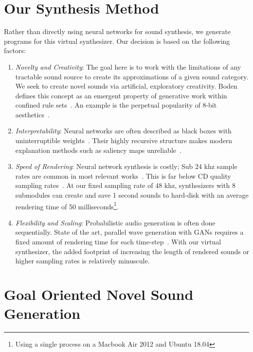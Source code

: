 \documentclass[\main/thesis.tex]{subfiles}
\begin{document}
\section{Our Synthesis Method}
 Rather than directly using neural networks for sound synthesis, we generate programs for this virtual synthesizer. Our decision is based on the following factors:
\begin{enumerate}[label=(\roman*)]
    \item \textit{Novelty and Creativity}: The goal here is to work with the limitations of any tractable sound source to create its approximations of a given sound category. We seek to create novel sounds via artificial, exploratory creativity. Boden defines this concept as an emergent property of generative work within confined rule sets~\cite{boden2009computer}. An example is the perpetual popularity of 8-bit aesthetics~\cite{collins2007loop}. 
    \item \textit{Interpretability}: Neural networks are often described as black boxes with uninterruptible weights~\cite{basheer2000artificial}. Their highly recursive structure makes modern explanation methods such as saliency maps unreliable~\cite{rudin2019stop}.  
    \item \textit{Speed of Rendering}: Neural network synthesis is costly; Sub 24 khz sample rates are common in most relevant works~\cite{yamamoto2020parallel,oord2017parallel,aouameur2019neural,ramires2020neural}. This is far below CD quality sampling rates~\cite{reiss2016meta}. At our fixed sampling rate of 48 khz, synthesizers with 8 submodules can create and save 1 second sounds to hard-disk with an average rendering time of 50 milliseconds\footnote{Using a single process on a Macbook Air 2012 and Ubuntu 18.04}. 
    \item \textit{Flexibility and Scaling}: Probabilistic audio generation is often done sequentially. State of the art, parallel wave generation with GANs requires a fixed amount of rendering time for each time-step~\cite{yamamoto2020parallel}. With our virtual synthesizer, the added footprint of increasing the length of rendered sounds or higher sampling rates is relatively minuscule.  
\end{enumerate}

\section{Goal Oriented Novel Sound Generation}

\label{related}
\end{document}
